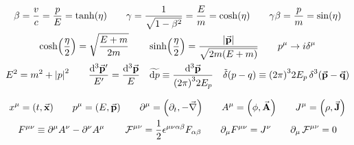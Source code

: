\begin{gather*}
        \beta
        = \frac{v}{c}
        = \frac{p}{E}
        = \tanh(\eta)
        \qquad
        \gamma
        = \frac{1}{\sqrt{1-\beta^2}}
        = \frac{E}{m}
        = \cosh(\eta)
        \qquad
        \gamma\beta
        = \frac{p}{m}
        = \sin(\eta)
        \\
        \cosh(\frac{\eta}{2}) = \sqrt{\frac{E+m}{2m}}
        \qquad
        \sinh(\frac{\eta}{2}) = \frac{\abs{\va{p}}}{\sqrt{2m\qty(E+m)}}
        \qquad
        p^\mu \to i \delta^\mu
        \\
        E^2 = m^2 + \abs{p}^2
        \qquad
        \frac{\dd[3]{\va{p}'}}{E'} = \frac{\dd[3]{\va{p}}}{E}
        \quad
        \widetilde{\dd{p}} \equiv \frac{\dd[3]{\va{p}}}{\qty(2\pi)^32E_p}
        \quad
        \tilde{\delta}\qty(p-q) \equiv \qty(2\pi)^32E_p\Ddelta[3](\va{p}-\va{q})
\end{gather*}

\begin{gather*}
        x^{\mu} = (t, \va{x})
        \qquad
        p^{\mu} = (E, \va{p})
        \qquad
        \partial^{\mu} = \qty(\partial_t, -\va{\nabla})
        \qquad
        A^{\mu} = \qty(\phi, \va{A})
        \qquad
        J^{\mu} = \qty(\rho, \va{J})
        \\
        F^{\mu\nu} \equiv \partial^\mu A^\nu - \partial^\nu A^\mu
        \qquad
        \operatorname{\mathcal{F}}^{\mu\nu} = \frac{1}{2}\epsilon^{\mu\nu\alpha\beta}F_{\alpha\beta}
        \qquad
        \partial_\mu F^{\mu\nu} = J^{\nu}
        \qquad
        \partial_\mu \operatorname{\mathcal{F}}^{\mu\nu} = 0
\end{gather*}


